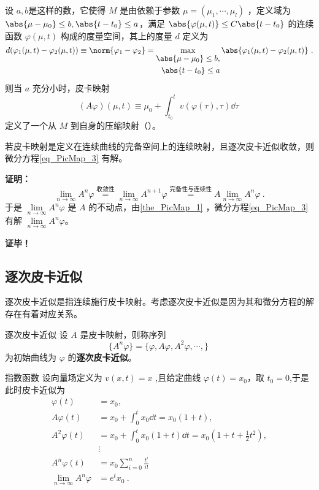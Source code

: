 \begin{theorem}{}
设 $a,b$是这样的数，它使得 $M$ 是由依赖于参数 $\mu=(\mu_1,\cdots,\mu_l)$ ，定义域为 $\abs{\mu-\mu_0}\leq b,\abs{t-t_0}\leq a$，满足 $\abs{\varphi(\mu,t)}\leq C\abs{t-t_0}$ 的连续函数 $\varphi(\mu,t)$ 构成的度量空间，其上的度量 $d$ 定义为
\begin{equation}
d(\varphi_1(\mu,t)-\varphi_2(\mu,t))\equiv\norm{\varphi_1-\varphi_2}=\max_{\begin{aligned}\abs{\mu-\mu_0}\leq b,\\\abs{t-t_0}\leq a\end{aligned}}\abs{\varphi_1(\mu,t)-\varphi_2(\mu,t)}~.
\end{equation}
则当 $a$ 充分小时，皮卡映射
\begin{equation}
(A\varphi)(\mu,t)\equiv \mu_0+\int_{t_0}^{t}v(\varphi(\tau),\tau)\dd \tau~
\end{equation}
定义了一个从 $M$ 到自身的压缩映射（）。

若皮卡映射是定义在连续曲线的完备空间上的连续映射，且逐次皮卡近似收敛，则微分方程\autoref{eq_PicMap_3} 有解。
\end{theorem}
\textbf{证明：}
\begin{equation}
\lim_{n\rightarrow\infty}A^n\varphi\overset{\text{收敛性}}{=}\lim_{n\rightarrow\infty}A^{n+1}\varphi \overset{\text{完备性与连续性}}{=}A\lim_{n\rightarrow\infty}A^n\varphi~.
\end{equation}
于是 $\lim\limits_{n\rightarrow\infty}A^n\varphi$ 是 $A$ 的不动点，由\autoref{the_PicMap_1} ，微分方程\autoref{eq_PicMap_3} 有解 $\lim\limits_{n\rightarrow\infty}A^n\varphi$。


\textbf{证毕！}
\subsection{逐次皮卡近似}
逐次皮卡近似是指连续施行皮卡映射。考虑逐次皮卡近似是因为其和微分方程的解存在有着对应关系。
\begin{definition}{逐次皮卡近似}
设 $A$ 是皮卡映射，则称序列
\begin{equation}
\{A^n\varphi\}=\{\varphi, A\varphi, A^2\varphi,\cdots,\}~ 
\end{equation}
为初始曲线为 $\varphi$ 的\textbf{逐次皮卡近似}。
\end{definition}

\begin{example}{指数函数}
设向量场定义为 $v(x,t)=x$ ,且给定曲线 $\varphi(t)=x_0$，取 $t_0=0$,于是此时皮卡近似为
\begin{equation}
\begin{aligned}
\varphi(t)&=x_0,\\
A\varphi(t)&=x_0+\int_{0}^{t}x_0\dd t=x_0(1+t),\\
A^2\varphi(t)&=x_0+\int_{0}^{t}x_0(1+t)\dd t=x_0(1+t+\frac{1}{2}t^2),\\
&\vdots\\
A^n\varphi(t)&=x_0\sum_{i=0}^n\frac{t^i}{i!}\\
\lim_{n\rightarrow\infty}A^n\varphi&=e^tx_0
~.
\end{aligned}
\end{equation}
\end{example}
